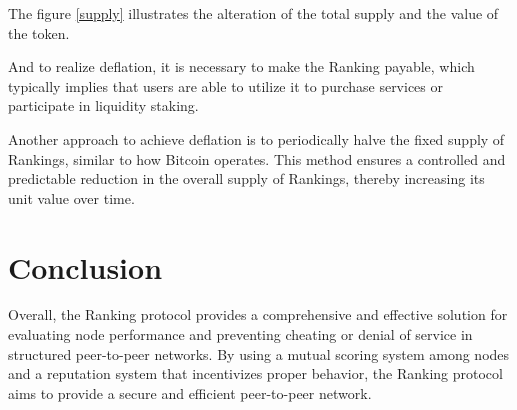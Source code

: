 \documentclass[twocolumn]{article}
\begin{document}
The figure \ref{supply} illustrates the alteration of the total supply and the value of the token.

And to realize deflation, it is necessary to make the Ranking payable, which typically implies that users are able to utilize it to purchase services or participate in liquidity staking.

Another approach to achieve deflation is to periodically halve the fixed supply of Rankings, similar to how Bitcoin operates. This method ensures a controlled and predictable reduction in the overall supply of Rankings, thereby increasing its unit value over time.


\section{Conclusion}
Overall, the Ranking protocol provides a comprehensive and effective solution for evaluating node performance and preventing cheating or denial of service in structured peer-to-peer networks. By using a mutual scoring system among nodes and a reputation system that incentivizes proper behavior, the Ranking protocol aims to provide a secure and efficient peer-to-peer network.


\end{document}
